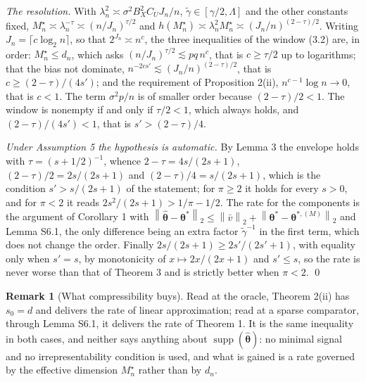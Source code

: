 \documentclass[10pt]{book}
\theoremstyle{definition}
\newtheorem{remark}{Remark}[section]
\newcommand{\norm}[1]{\left\lVert #1 \right\rVert}
\newcommand{\btheta}{\boldsymbol{\theta}}
\newcommand{\thetastar}{\btheta^{*}}
\newcommand{\thetahat}{\widehat{\btheta}}
\newcommand{\penn}{\lambda_{n}}
\newcommand{\seff}{s'}
\newcommand{\gtil}{\widetilde{\gamma}}
\newcommand{\Mstar}{M^{\star}}
\newcommand{\thstarM}[1]{\btheta^{*,(#1)}}
\DeclareMathOperator{\supp}{supp}
\begin{document}
\emph{The resolution.} With $\penn^2 \asymp \sigma^2B_X^2C_UJ_n/n$,
$\gtil \in [\gamma/2,\Lambda]$ and the other constants fixed,
$\Mstar_n \asymp \penn^{-\tau} \asymp (n/J_n)^{\tau/2}$ and
$h(\Mstar_n) \asymp \penn^2\Mstar_n \asymp (J_n/n)^{(2-\tau)/2}$. Writing
$J_n = \lceil c\log_2 n\rceil$, so that $2^{J_n} \asymp n^{c}$, the three
inequalities of the window (3.2) are, in order: $\Mstar_n \le d_n$, which asks
$(n/J_n)^{\tau/2} \lesssim pq\,n^{c}$, that is $c \ge \tau/2$ up to
logarithms; that the bias not dominate, $n^{-2c\seff} \lesssim
(J_n/n)^{(2-\tau)/2}$, that is $c \ge (2-\tau)/(4\seff)$; and the requirement
of Proposition 2(ii), $n^{c-1}\log n \to 0$, that is $c<1$. The term
$\sigma^2p/n$ is of smaller order because $(2-\tau)/2<1$. The window is
nonempty if and only if $\tau/2<1$, which always holds, and
$(2-\tau)/(4\seff)<1$, that is $\seff>(2-\tau)/4$.

\emph{Under Assumption 5 the hypothesis is automatic.} By Lemma 3 the
envelope holds with $\tau = (s+1/2)^{-1}$, whence $2-\tau = 4s/(2s+1)$,
$(2-\tau)/2 = 2s/(2s+1)$ and $(2-\tau)/4 = s/(2s+1)$, which is the condition
$\seff>s/(2s+1)$ of the statement; for $\pi \ge 2$ it holds for every $s>0$,
and for $\pi<2$ it reads $2s^2/(2s+1)>1/\pi-1/2$. The rate for the components
is the argument of Corollary 1 with
$\norm{\thetahat-\thetastar}_2 \le \norm{\bar v}_2 +
\norm{\thetastar-\thstarM{M}}_2$ and Lemma S6.1, the only difference being an
extra factor $\gtil^{-1}$ in the first term, which does not change the order.
Finally $2s/(2s+1) \ge 2\seff/(2\seff+1)$, with equality only when
$\seff = s$, by monotonicity of $x \mapsto 2x/(2x+1)$ and $\seff \le s$, so
the rate is never worse than that of Theorem 3 and is strictly better when
$\pi<2$. \qed

\begin{remark}[What compressibility buys]
\label{rem:s0}
Read at the oracle, Theorem 2(ii) has $s_0 = d$ and delivers the rate of
\textcolor{colR1}{linear approximation}; read at a sparse comparator, through Lemma S6.1, it delivers the rate
of Theorem 1. It is the same inequality in both cases, and neither says
anything about $\supp(\thetahat)$: no minimal signal and no
irrepresentability condition is used, and what is gained is a rate governed by
the effective dimension $\Mstar_n$ rather than by $d_n$.
\end{remark}
\end{document}
